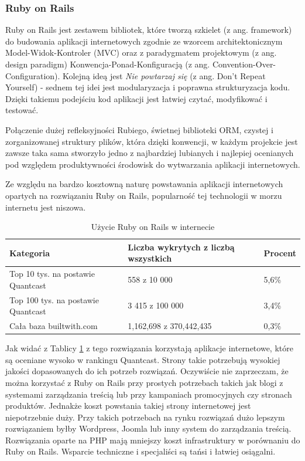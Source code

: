 \subsubsection{Ruby on Rails}
Ruby on Rails jest zestawem bibliotek, które tworzą szkielet (z ang. framework) do budowania aplikacji internetowych zgodnie ze wzorcem architektonicznym Model-Widok-Kontroler (MVC) oraz z paradygmatem projektowym (z ang. design paradigm) Konwencja-Ponad-Konfiguracją (z ang. Convention-Over-Configuration). Kolejną ideą jest \textit{Nie powtarzaj się} (z ang. Don't Repeat Yourself) - sednem tej idei jest modularyzacja i poprawna strukturyzacja kodu. Dzięki takiemu podejściu kod aplikacji jest łatwiej czytać, modyfikować i testować.


Połączenie dużej refleksyjności Rubiego, świetnej biblioteki ORM, czystej i zorganizowanej struktury plików, która dzięki konwencji, w każdym projekcie jest zawsze taka sama stworzyło jedno z najbardziej lubianych i najlepiej ocenianych pod względem produktywności środowisk do wytwarzania aplikacji internetowych.

Ze względu na bardzo kosztowną naturę powstawania aplikacji internetowych opartych na rozwiązaniu Ruby on Rails, popularność tej technologii w morzu internetu jest niszowa.\cite{TrendsBuiltWithRails}

\begin{table}[h]
\caption{Użycie Ruby on Rails w internecie}
\label{table:rubyusage}
\begin{tabular}{ |l|l|l|  }
\hline
Kategoria & Liczba wykrytych z liczbą wszystkich & Procent \\
\hline
\hline
Top 10 tys. na postawie Quantcast & 558 z 10 000 & 5,6\% \\
\hline
Top 100 tys. na postawie Quantcast & 3 415 z 100 000 & 3,4\% \\
\hline
Cała baza builtwith.com & 1,162,698 z 370,442,435 & 0,3\% \\
\hline
\end{tabular}
\end{table}

Jak widać z Tablicy \ref{table:rubyusage} z tego rozwiązania korzystają aplikacje internetowe, które są oceniane wysoko w rankingu Quantcast. Strony takie potrzebują wysokiej jakości dopasowanych do ich potrzeb rozwiązań. Oczywiście nie zaprzeczam, że można korzystać z Ruby on Rails przy prostych potrzebach takich jak blogi z systemami zarządzania treścią lub przy kampaniach promocyjnych czy stronach produktów. Jednakże koszt powstania takiej strony internetowej jest niepotrzebnie duży. Przy takich potrzebach na rynku rozwiązań dużo lepszym rozwiązaniem byłby Wordpress, Joomla lub inny system do zarządzania treścią. Rozwiązania oparte na PHP mają mniejszy koszt infrastruktury w porównaniu do Ruby on Rails. Wsparcie techniczne i specjaliści są tańsi i łatwiej osiągalni.

